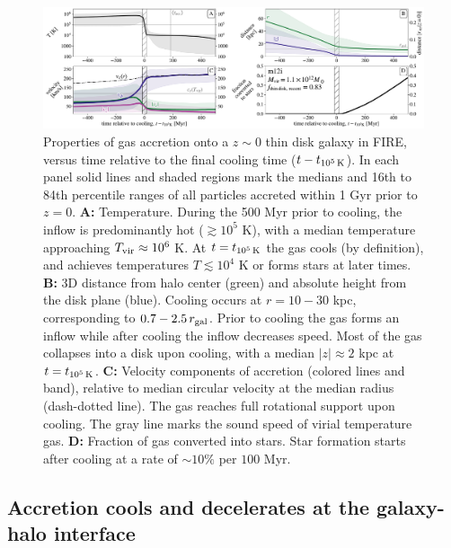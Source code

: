 \documentclass[fleqn,usenatbib]{mnras}
\newcommand{\tcools}{t_{10^5\,{\rm K}}}
\newcommand{\tacc}{t_{\rm acc}}
\newcommand{\Tvir}{T_{\rm vir}}
\begin{document}
\begin{figure}
\includegraphics[width=\textwidth]{figures/before_and_after/before_and_after_characteristics_m12i_md.pdf}
\caption{
Properties of gas accretion onto a $z\sim0$ thin disk galaxy in FIRE, versus time relative to the final cooling time ($t - \tcools$).
In each panel solid lines and shaded regions mark the medians and 16th to 84th percentile ranges of all particles accreted within 1 Gyr prior to $z=0$. 
\textbf{A:}
Temperature.
During the 500 Myr prior to cooling, the inflow is predominantly hot ($\gtrsim 10^5$ K), with a median temperature approaching $\Tvir\approx10^6$ K.
At $t = \tcools$ the gas cools (by definition), and achieves  temperatures $T\lesssim10^4$ K or forms stars at later times. 
\textbf{B:}
3D distance from halo center (green) and absolute height from the disk plane (blue).
Cooling occurs at $r=10-30$ kpc, corresponding to $0.7-2.5\,r_{\rm gal}$.
Prior to cooling the gas forms an inflow while after cooling the inflow decreases speed.
Most of the gas collapses into a disk upon cooling, with a median $\vert z \vert \approx 2$ kpc at $t=\tcools$.
\textbf{C:}
Velocity components of accretion (colored lines and band), relative to median circular velocity at the median radius (dash-dotted line).
The gas reaches full rotational support upon cooling. The gray line marks the sound speed of virial temperature gas.
\textbf{D:}
Fraction of gas converted into stars.
Star formation starts after cooling %
at a rate of $\sim10\%$ per $100$ Myr.
}
\label{f: before and after A}
\end{figure}


\subsection{Accretion cools and decelerates at the galaxy-halo interface}
\label{s: characteristics -- cools}
\end{document}
